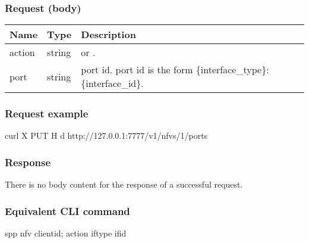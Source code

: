 \documentclass[a4paper,11pt,openany,oneside,english]{sphinxmanual}
\begin{document}
\subsubsection{Request (body)}
\label{\detokenize{api_ref/spp_nfv:id6}}

\begin{savenotes}\sphinxattablestart
\centering
{}
\sphinxthecaptionisattop
{}\label{\detokenize{api_ref/spp_nfv:id29}}\label{\detokenize{api_ref/spp_nfv:table-spp-ctl-spp-nfv-ports-get-body}}
\sphinxaftertopcaption
\begin{tabulary}{\linewidth}[t]{|T|T|T|}
\hline
\sphinxstyletheadfamily 
Name
&\sphinxstyletheadfamily 
Type
&\sphinxstyletheadfamily 
Description
\\
\hline
action
&
string
&
 or .
\\
\hline
port
&
string
&
port id. port id is the form \{interface\_type\}:\{interface\_id\}.
\\
\hline
\end{tabulary}
\par
\sphinxattableend\end{savenotes}


\subsubsection{Request example}
\label{\detokenize{api_ref/spp_nfv:id7}}
\begin{sphinxVerbatim}[commandchars=\\\{\},formatcom=\footnotesize]
 curl \PYGZhy{}X PUT \PYGZhy{}H  
  \PYGZhy{}d  
  http://127.0.0.1:7777/v1/nfvs/1/ports
\end{sphinxVerbatim}


\subsubsection{Response}
\label{\detokenize{api_ref/spp_nfv:id8}}
There is no body content for the response of a successful  request.


\subsubsection{Equivalent CLI command}
\label{\detokenize{api_ref/spp_nfv:id9}}
\begin{sphinxVerbatim}[commandchars=\\\{\},formatcom=\footnotesize]
spp \PYGZgt{} nfv \PYGZob{}client\PYGZus{}id\PYGZcb{}; \PYGZob{}action\PYGZcb{} \PYGZob{}if\PYGZus{}type\PYGZcb{} \PYGZob{}if\PYGZus{}id\PYGZcb{}
\end{sphinxVerbatim}
\end{document}
